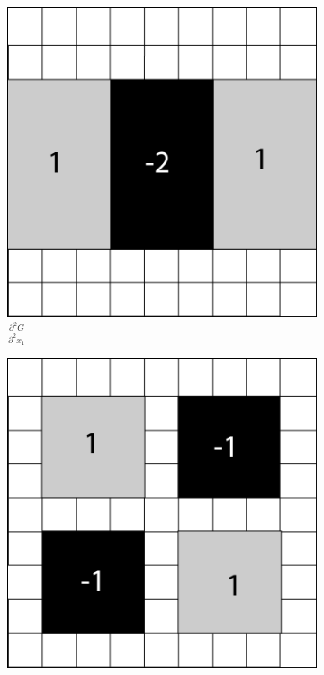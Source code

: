 \documentclass{article}
\begin{document}
\begin{figure}[h]
	\centering
	\begin{subfigure}[b]{0.3\textwidth}
		\centering
		\includegraphics[width=\textwidth]{figures/hessian/gaussian_second_order_kernel_xx}
		\caption{$\frac{\partial^2 G}{\partial^2 x_1}$}
	\end{subfigure}
	\begin{subfigure}[b]{0.3\textwidth}
		\centering
		\includegraphics[width=\textwidth]{figures/hessian/gaussian_second_order_kernel_xy}

\end{subfigure}
\end{figure}
\end{document}
